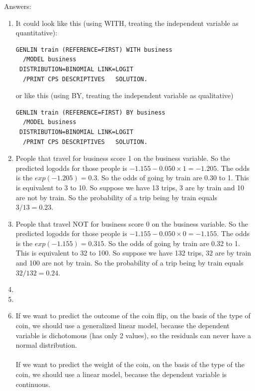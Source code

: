 \documentclass[]{book}\usepackage[]{graphicx}\usepackage[]{color}
\begin{document}
Answers:
\begin{enumerate}


\item
It could look like this (using WITH, treating the independent variable as quantitative):

\begin{verbatim}
GENLIN train (REFERENCE=FIRST) WITH business
  /MODEL business
 DISTRIBUTION=BINOMIAL LINK=LOGIT
  /PRINT CPS DESCRIPTIVES   SOLUTION.
\end{verbatim}


or like this (using BY, treating the independent variable as qualitative)

\begin{verbatim}
GENLIN train (REFERENCE=FIRST) BY business
  /MODEL business
 DISTRIBUTION=BINOMIAL LINK=LOGIT
  /PRINT CPS DESCRIPTIVES   SOLUTION.
\end{verbatim}


\item
People that travel for business score 1 on the business variable. So the predicted logodds for those people is $-1.155 - 0.050 \times 1 = -1.205$. The odds is the $exp(-1.205)=0.3 $. So the odds of going by train are 0.30 to 1. This is equivalent to 3 to 10. So suppose we have 13 trips, 3 are by train and 10 are not by train. So the probability of a trip being by train equals $3/13=0.23$.

\item
People that travel NOT for business score 0 on the business variable. So the predicted logodds for those people is $-1.155 - 0.050 \times 0 = -1.155$. The odds is the $exp(-1.155)=0.315 $. So the odds of going by train are 0.32 to 1. This is equivalent to 32 to 100. So suppose we have 132 trips, 32 are by train and 100 are not by train. So the probability of a trip being by train equals $32/132=0.24$.

\item


\item

\item


If we want to predict the outcome of the coin flip, on the basis of the type of coin, we should use a generalized linear model, because the dependent variable is dichotomous (has only 2 values), so the residuals can never have a normal distribution.
\\
\\
If we want to predict the weight of the coin, on the basis of the type of the coin, we should use a linear model, because the dependent variable is continuous.


\end{enumerate}
\end{document}
